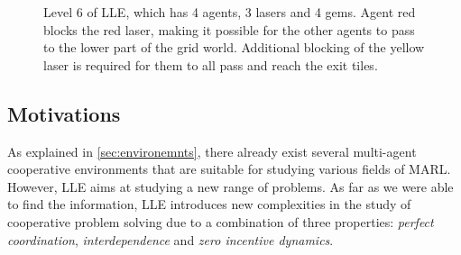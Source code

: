\begin{figure}
  \centering
  \scriptsize
  \caption{Level 6 of LLE, which has 4 agents, 3 lasers and 4 gems. Agent red blocks the red laser, making it possible for the other agents to pass to the lower part of the grid world. Additional blocking of the yellow laser is required for them to all pass and reach the exit tiles.}
    \label{fig:lvl6-annotated}
\end{figure}

\subsection{Motivations}
\label{sec:motivations}
As explained in \autoref{sec:environemnts}, there already exist several multi-agent cooperative environments that are suitable for studying various fields of MARL. However, LLE aims at studying a new range of problems. As far as we were able to find the information, LLE introduces new complexities in the study of cooperative problem solving due to a combination of three properties: \textit{perfect coordination}, \textit{interdependence} and \textit{zero incentive dynamics}.

